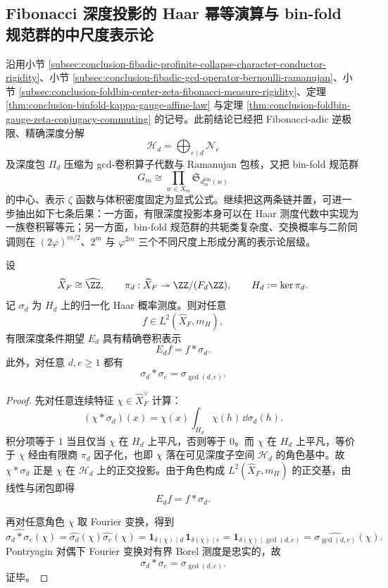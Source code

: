 \subsection{Fibonacci 深度投影的 Haar 幂等演算与 bin-fold 规范群的中尺度表示论}\label{subsec:conclusion-fibadic-haar-randomdepth-binfold-conjugacy-schur}
沿用小节 \ref{subsec:conclusion-fibadic-profinite-collapse-character-conductor-rigidity}、小节 \ref{subsec:conclusion-fibadic-gcd-operator-bernoulli-ramanujan}、小节 \ref{subsec:conclusion-foldbin-center-zeta-fibonacci-measure-rigidity}、定理 \ref{thm:conclusion-binfold-kappa-gauge-affine-law} 与定理 \ref{thm:conclusion-foldbin-gauge-zeta-conjugacy-commuting} 的记号。此前结论已经把 Fibonacci-adic 逆极限、精确深度分解
\[
\mathcal H_d=\bigoplus_{e\mid d}\mathcal N_e
\]
及深度包 \(\Pi_d\) 压缩为 gcd-卷积算子代数与 Ramanujan 包核，又把 bin-fold 规范群
\[
G_m\cong \prod_{w\in X_m}\mathfrak S_{d_m^{\mathrm{bin}}(w)}
\]
的中心、表示 \(\zeta\) 函数与体积密度固定为显式公式。继续把这两条链并置，可进一步抽出如下七条后果：一方面，有限深度投影本身可以在 Haar 测度代数中实现为一族卷积幂等元；另一方面，bin-fold 规范群的共轭类复杂度、交换概率与二阶同调则在 \((2\varphi)^{m/2}\)、\(2^m\) 与 \(\varphi^{2m}\) 三个不同尺度上形成分离的表示论层级。

\begin{theorem}\label{thm:conclusion-fibadic-haar-conditional-expectation-convolution}
设
\[
\widehat X_F\cong \widehat{\ZZ},
\qquad
\pi_d:\widehat X_F\twoheadrightarrow \ZZ/(F_d\ZZ),
\qquad
H_d:=\ker \pi_d.
\]
记 \(\sigma_d\) 为 \(H_d\) 上的归一化 Haar 概率测度。则对任意
\[
f\in L^2(\widehat X_F,m_H),
\]
有限深度条件期望 \(E_d\) 具有精确卷积表示
\[
E_df=f*\sigma_d.
\]
此外，对任意 \(d,e\ge 1\) 都有
\[
\sigma_d*\sigma_e=\sigma_{\gcd(d,e)}.
\]
\end{theorem}
\begin{proof}
先对任意连续特征 \(\chi\in \widehat X_F^\vee\) 计算：
\[
(\chi*\sigma_d)(x)
=
\chi(x)\int_{H_d}\chi(h)\,\dd \sigma_d(h).
\]
积分项等于 \(1\) 当且仅当 \(\chi\) 在 \(H_d\) 上平凡，否则等于 \(0\)。而 \(\chi\) 在 \(H_d\) 上平凡，等价于 \(\chi\) 经由有限商 \(\pi_d\) 因子化，也即 \(\chi\) 落在可见深度子空间 \(\mathcal H_d\) 的角色基中。故 \(\chi*\sigma_d\) 正是 \(\chi\) 在 \(\mathcal H_d\) 上的正交投影。由于角色构成 \(L^2(\widehat X_F,m_H)\) 的正交基，由线性与闭包即得
\[
E_df=f*\sigma_d.
\]

再对任意角色 \(\chi\) 取 Fourier 变换，得到
\[
\widehat{\sigma_d*\sigma_e}(\chi)
=
\widehat{\sigma_d}(\chi)\widehat{\sigma_e}(\chi)
=
\mathbf 1_{\delta(\chi)\mid d}\,\mathbf 1_{\delta(\chi)\mid e}
=
\mathbf 1_{\delta(\chi)\mid \gcd(d,e)}
=
\widehat{\sigma_{\gcd(d,e)}}(\chi).
\]
Pontryagin 对偶下 Fourier 变换对有界 Borel 测度是忠实的，故
\[
\sigma_d*\sigma_e=\sigma_{\gcd(d,e)}.
\]
证毕。
\end{proof}

